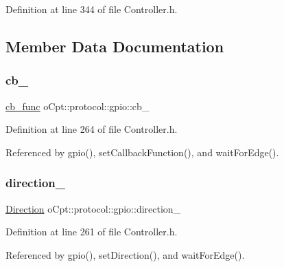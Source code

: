 Definition at line 344 of file Controller.\+h.



\subsection{Member Data Documentation}
\hypertarget{classo_cpt_1_1protocol_1_1gpio_a7d9d6a711dd0ba0d51649b85ca4d5bf4}{}\label{classo_cpt_1_1protocol_1_1gpio_a7d9d6a711dd0ba0d51649b85ca4d5bf4} 
\subsubsection{\texorpdfstring{cb\+\_\+}{cb\_}}
{\footnotesize\ttfamily \hyperlink{classo_cpt_1_1protocol_1_1gpio_ad553926a5fc9db445e7c9715abede2e3}{cb\+\_\+func} o\+Cpt\+::protocol\+::gpio\+::cb\+\_\+\hspace{0.3cm}{\ttfamily [private]}}



Definition at line 264 of file Controller.\+h.



Referenced by gpio(), set\+Callback\+Function(), and wait\+For\+Edge().

\hypertarget{classo_cpt_1_1protocol_1_1gpio_adb5c9fe44ef91bf37812e9cdfd3141d4}{}\label{classo_cpt_1_1protocol_1_1gpio_adb5c9fe44ef91bf37812e9cdfd3141d4} 
\subsubsection{\texorpdfstring{direction\+\_\+}{direction\_}}
{\footnotesize\ttfamily \hyperlink{classo_cpt_1_1protocol_1_1gpio_af7acf963933bbc47d11d6fa1b8ce4d5b}{Direction} o\+Cpt\+::protocol\+::gpio\+::direction\+\_\+\hspace{0.3cm}{\ttfamily [private]}}



Definition at line 261 of file Controller.\+h.



Referenced by gpio(), set\+Direction(), and wait\+For\+Edge().

\hypertarget{classo_cpt_1_1protocol_1_1gpio_abdd5f6e987fdca5748a35622f72eaf2f}{}\label{classo_cpt_1_1protocol_1_1gpio_abdd5f6e987fdca5748a35622f72eaf2f} 
